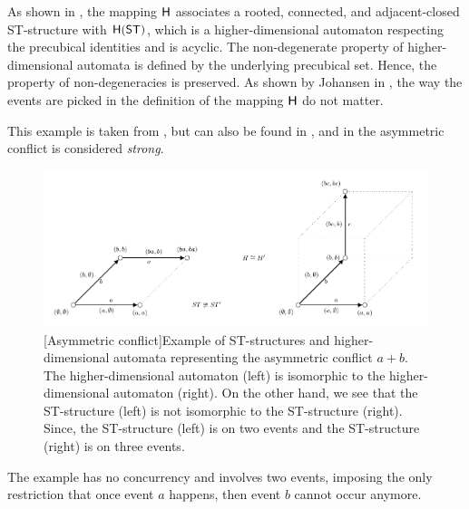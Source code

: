     As shown in \cite[Theorem 3.36]{Johansen16STstruct}, the mapping $\mathsf{H}$ associates a rooted, connected, and adjacent-closed ST-structure with $\mathsf{H}(\mathsf{ST})$, which is a higher-dimensional automaton respecting the precubical identities and is acyclic. The non-degenerate property of higher-dimensional automata is defined by the underlying precubical set. Hence, the property of non-degeneracies is preserved. As shown by Johansen in \cite[Lemma 3.37]{Johansen16STstruct}, the way the events are picked in the definition of the mapping $\mathsf{H}$ do not matter.

    \begin{example}
        \label{exp:asymmetric-conflict}
        This example is taken from \cite[Example 3.38]{Johansen16STstruct}, but can also be found in \cite[Example 3]{GlabbeekP09configStruct}, and in \cite[page.22]{Pratt03trans_cancel} the asymmetric conflict is considered \emph{strong}. 
    
        \begin{figure}[ht]
            \centering
            \includegraphics[scale=0.9]{Figures/4.Relationship-with-other-models-of-concurrency/ST-structure-and-HDA/Asymmetric-conflict.pdf}
            [Asymmetric conflict]{Example of ST-structures and higher-dimensional automata representing the asymmetric conflict $a + b$. The higher-dimensional automaton (left) is isomorphic to the higher-dimensional automaton (right). On the other hand, we see that the ST-structure (left) is not isomorphic to the ST-structure (right). Since, the ST-structure (left) is on two events and the ST-structure (right) is on three events.}
            \label{fig:asymmetric-conflict-st-hda}
        \end{figure}
    
        The example has no concurrency and involves two events, imposing the only restriction that once event $a$ happens, then event $b$ cannot occur anymore. 
    

\end{example}
